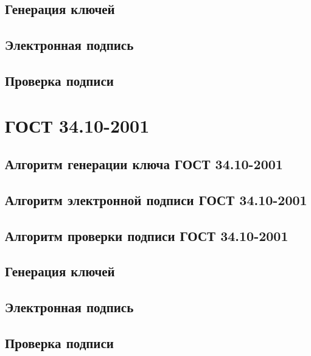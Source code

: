 \documentclass{article}
\begin{document}
\subsection{Генерация ключей}
\subsection{Электронная подпись}
\subsection{Проверка подписи}

\section{ГОСТ 34.10-2001}
\subsection{Алгоритм генерации ключа ГОСТ 34.10-2001}
\subsection{Алгоритм электронной подписи ГОСТ 34.10-2001}
\subsection{Алгоритм проверки подписи ГОСТ 34.10-2001}
\subsection{Генерация ключей}
\subsection{Электронная подпись}
\subsection{Проверка подписи}
\end{document}
